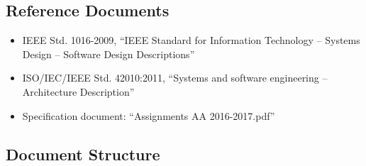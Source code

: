 \documentclass[english]{article}
\begin{document}
\subsection{Reference Documents}

\begin{itemize}
	\item{IEEE Std. 1016-2009, “IEEE Standard for Information Technology -- Systems Design -- Software Design Descriptions”}
	\item{ISO/IEC/IEEE Std. 42010:2011, “Systems and software engineering -- Architecture Description”}
	\item{Specification document: “Assignments AA 2016-2017.pdf”}
\end{itemize}

\newpage{}

\subsection{Document Structure}
\end{document}
